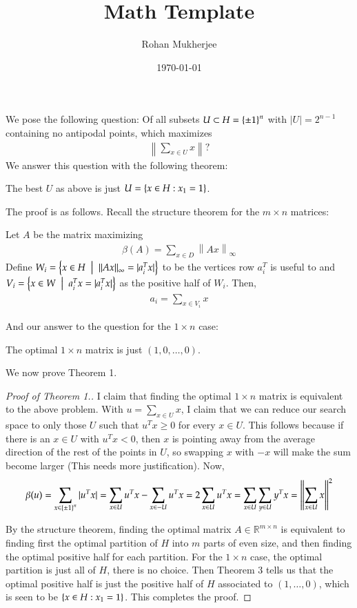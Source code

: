 \documentclass[12pt]{article}
\title{Math Template}
\date{\today}
\author{Rohan Mukherjee}
\newenvironment{theorem}{\begin{mytheorem}}{\end{mytheorem}}
\theoremstyle{definitionstyle}
\def\mbb#1{\mathbb{#1}}
\def\R{\mbb{R}}
\newcommand{\mg}[1]{\left\| #1 \right\|}
\newcommand{\SET}[1]{\Set{\mskip-\medmuskip #1 \mskip-\medmuskip}}
\begin{document}
    \maketitle
    We pose the following question: Of all subsets $U \subset H = \SET{\pm 1}^n$ with $|U| = 2^{n-1}$ containing no antipodal points, which maximizes
    \begin{align*}
        \mg{\sum_{x \in U} x}?
    \end{align*}
    We answer this question with the following theorem:
    \begin{theorem}
        The best $U$ as above is just $U = \SET{x \in H : x_1 = 1}$.
    \end{theorem}
    The proof is as follows. Recall the structure theorem for the $m \times n$ matrices:
    \begin{theorem}[Structure Theorem]
        Let $A$ be the matrix maximizing 
        \begin{align*}
            \beta(A) = \sum_{x \in D} \mg{Ax}_\infty
        \end{align*}
        Define $W_i = \SET{x \in H \; | \; \mg{Ax}_\infty = |a_i^Tx|}$ to be the vertices row $a_i^T$ is useful to and $V_i = \SET{x \in W \; | \; a_i^Tx = |a_i^Tx|}$ as the positive half of $W_i$. Then,
        \begin{align*}
            a_i = \sum_{x \in V_i} x
        \end{align*}
    \end{theorem}
    And our answer to the question for the $1 \times n$ case:
    \begin{theorem}
        The optimal $1 \times n$ matrix is just $(1, 0, \ldots, 0)$. 
    \end{theorem}

    We now prove Theorem 1.
    \begin{proof}[Proof of Theorem 1.]
        I claim that finding the optimal $1 \times n$ matrix is equivalent to the above problem. With $u = \sum_{x \in U} x$, I claim that we can reduce our search space to only those $U$ such that $u^Tx \geq 0$ for every $x \in U$. This follows because if there is an $x \in U$ with $u^Tx < 0$, then $x$ is pointing away from the average direction of the rest of the points in $U$, so swapping $x$ with $-x$ will make the sum become larger (This needs more justification). Now,
        \begin{align*}
            \beta(u) = \sum_{x \in \SET{\pm 1}^n} |u^Tx| = \sum_{x \in U} u^Tx - \sum_{x \in -U} u^Tx = 2\sum_{x \in U} u^Tx = \sum_{x \in U} \sum_{y \in U} y^Tx = \mg{\sum_{x \in U} x}^2
        \end{align*}

        By the structure theorem, finding the optimal matrix $A \in \R^{m \times n}$ is equivalent to finding first the optimal partition of $H$ into $m$ parts of even size, and then finding the optimal positive half for each partition. For the $1 \times n$ case, the optimal partition is just all of $H$, there is no choice. Then Theorem 3 tells us that the optimal positive half is just the positive half of $H$ associated to $(1, \ldots, 0)$, which is seen to be $\SET{x \in H : x_1 = 1}$. This completes the proof.
    \end{proof}
\end{document}
